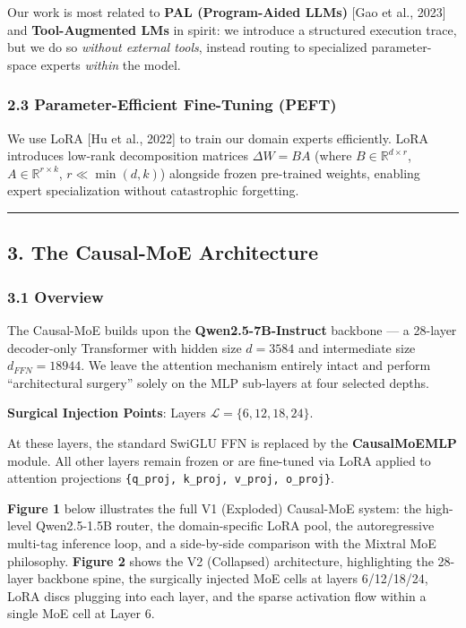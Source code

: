 Our work is most related to \textbf{PAL (Program-Aided LLMs)} {[}Gao et
al., 2023{]} and \textbf{Tool-Augmented LMs} in spirit: we introduce a
structured execution trace, but we do so \emph{without external tools},
instead routing to specialized parameter-space experts \emph{within} the
model.

\subsubsection{2.3 Parameter-Efficient Fine-Tuning
(PEFT)}\label{parameter-efficient-fine-tuning-peft}

We use LoRA {[}Hu et al., 2022{]} to train our domain experts
efficiently. LoRA introduces low-rank decomposition matrices
\(\Delta W = BA\) (where \(B \in \mathbb{R}^{d\times r}\),
\(A \in \mathbb{R}^{r\times k}\), \(r \ll \min(d,k)\)) alongside frozen
pre-trained weights, enabling expert specialization without catastrophic
forgetting.

\begin{center}\rule{0.5\linewidth}{0.5pt}\end{center}

\subsection{3. The Causal-MoE
Architecture}\label{the-causal-moe-architecture}

\subsubsection{3.1 Overview}\label{overview}

The Causal-MoE builds upon the \textbf{Qwen2.5-7B-Instruct} backbone ---
a 28-layer decoder-only Transformer with hidden size \(d = 3584\) and
intermediate size \(d_{FFN} = 18944\). We leave the attention mechanism
entirely intact and perform ``architectural surgery'' solely on the MLP
sub-layers at four selected depths.

\textbf{Surgical Injection Points}: Layers
\(\mathcal{L} = \{6, 12, 18, 24\}\).

At these layers, the standard SwiGLU FFN is replaced by the
\textbf{CausalMoEMLP} module. All other layers remain frozen or are
fine-tuned via LoRA applied to attention projections
\texttt{\{q\_proj,\ k\_proj,\ v\_proj,\ o\_proj\}}.

\textbf{Figure 1} below illustrates the full V1 (Exploded) Causal-MoE
system: the high-level Qwen2.5-1.5B router, the domain-specific LoRA
pool, the autoregressive multi-tag inference loop, and a side-by-side
comparison with the Mixtral MoE philosophy. \textbf{Figure 2} shows the
V2 (Collapsed) architecture, highlighting the 28-layer backbone spine,
the surgically injected MoE cells at layers 6/12/18/24, LoRA discs
plugging into each layer, and the sparse activation flow within a single
MoE cell at Layer 6.

